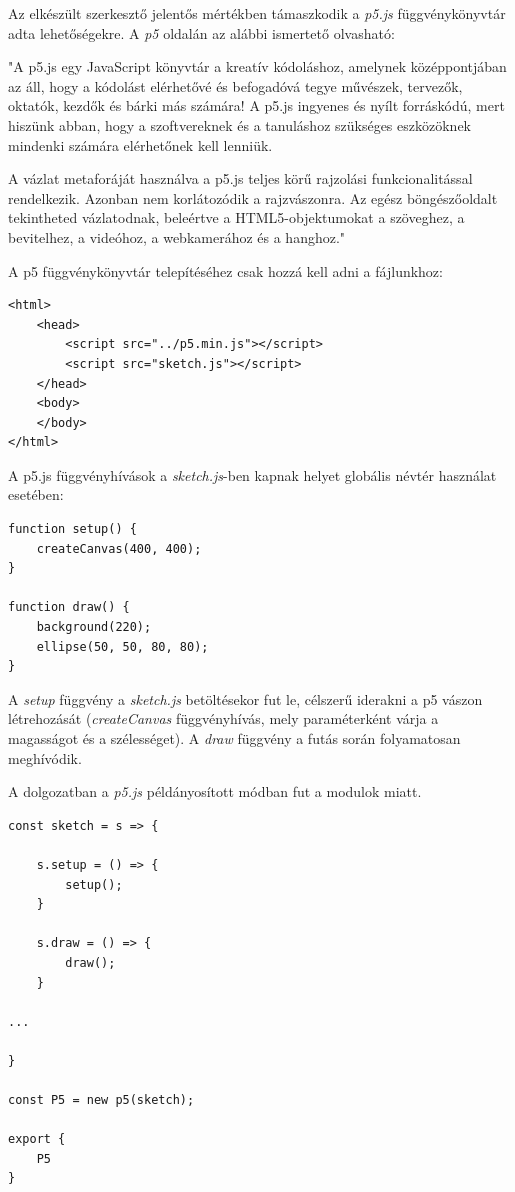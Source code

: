 

Az elkészült szerkesztő jelentős mértékben támaszkodik a \textit{p5.js} függvénykönyvtár adta lehetőségekre. A \textit{p5} oldalán az alábbi ismertető olvasható:

"A p5.js egy JavaScript könyvtár a kreatív kódoláshoz, amelynek középpontjában az áll, hogy a kódolást elérhetővé és befogadóvá tegye művészek, tervezők, oktatók, kezdők és bárki más számára! A p5.js ingyenes és nyílt forráskódú, mert hiszünk abban, hogy a szoftvereknek és a tanuláshoz szükséges eszközöknek mindenki számára elérhetőnek kell lenniük.

A vázlat metaforáját használva a p5.js teljes körű rajzolási funkcionalitással rendelkezik. Azonban nem korlátozódik a rajzvászonra. Az egész böngészőoldalt tekintheted vázlatodnak, beleértve a HTML5-objektumokat a szöveghez, a bevitelhez, a videóhoz, a webkamerához és a hanghoz\cite{p5js}."


A p5 függvénykönyvtár telepítéséhez csak hozzá kell adni a fájlunkhoz:

\begin{lstlisting}[style=html]
<html>
	<head>
		<script src="../p5.min.js"></script>
		<script src="sketch.js"></script>
	</head>
	<body>
	</body>
</html>
\end{lstlisting}


A p5.js függvényhívások a \textit{sketch.js}-ben kapnak helyet globális névtér használat esetében:

\begin{lstlisting}[style=es6]
function setup() {
	createCanvas(400, 400);
}

function draw() {
	background(220);
	ellipse(50, 50, 80, 80);
}
\end{lstlisting}

A \textit{setup} függvény a \textit{sketch.js} betöltésekor fut le, célszerű iderakni a p5 vászon létrehozását (\textit{createCanvas} függvényhívás, mely paraméterként várja a magasságot és a szélességet). A \textit{draw} függvény a futás során folyamatosan meghívódik.

A dolgozatban a \textit{p5.js} példányosított módban fut a modulok miatt.
\begin{lstlisting}[style=es6, morekeywords={P5}]
const sketch = s => {
	
	s.setup = () => {
		setup();
	}
	
	s.draw = () => {
		draw();
	}

...

}

const P5 = new p5(sketch);

export {
	P5
}
\end{lstlisting}

